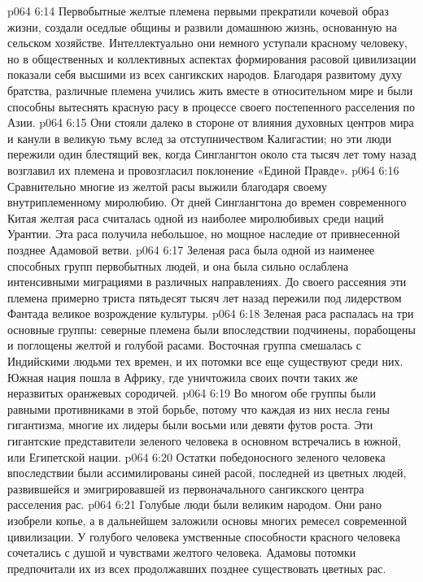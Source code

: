 \vs p064 6:14 \bibnobreakspace {} Первобытные желтые племена первыми прекратили кочевой образ жизни, создали оседлые общины и развили домашнюю жизнь, основанную на сельском хозяйстве. Интеллектуально они немного уступали красному человеку, но в общественных и коллективных аспектах формирования расовой цивилизации показали себя высшими из всех сангикских народов. Благодаря развитому духу братства, различные племена учились жить вместе в относительном мире и были способны вытеснять красную расу в процессе своего постепенного расселения по Азии.
\vs p064 6:15 Они стояли далеко в стороне от влияния духовных центров мира и канули в великую тьму вслед за отступничеством Калигастии; но эти люди пережили один блестящий век, когда Синглангтон около ста тысяч лет тому назад возглавил их племена и провозгласил поклонение «Единой Правде».
\vs p064 6:16 Сравнительно многие из желтой расы выжили благодаря своему внутриплеменному миролюбию. От дней Синглангтона до времен современного Китая желтая раса считалась одной из наиболее миролюбивых среди наций Урантии. Эта раса получила небольшое, но мощное наследие от привнесенной позднее Адамовой ветви.
\vs p064 6:17 \bibnobreakspace {} Зеленая раса была одной из наименее способных групп первобытных людей, и она была сильно ослаблена интенсивными миграциями в различных направлениях. До своего рассеяния эти племена примерно триста пятьдесят тысяч лет назад пережили под лидерством Фантада великое возрождение культуры.
\vs p064 6:18 Зеленая раса распалась на три основные группы: северные племена были впоследствии подчинены, порабощены и поглощены желтой и голубой расами. Восточная группа смешалась с Индийскими людьми тех времен, и их потомки все еще существуют среди них. Южная нация пошла в Африку, где уничтожила своих почти таких же неразвитых оранжевых сородичей.
\vs p064 6:19 Во многом обе группы были равными противниками в этой борьбе, потому что каждая из них несла гены гигантизма, многие их лидеры были восьми или девяти футов роста. Эти гигантские представители зеленого человека в основном встречались в южной, или Египетской нации.
\vs p064 6:20 Остатки победоносного зеленого человека впоследствии были ассимилированы синей расой, последней из цветных людей, развившейся и эмигрировавшей из первоначального сангикского центра расселения рас.
\vs p064 6:21 \bibnobreakspace {} Голубые люди были великим народом. Они рано изобрели копье, а в дальнейшем заложили основы многих ремесел современной цивилизации. У голубого человека умственные способности красного человека сочетались с душой и чувствами желтого человека. Адамовы потомки предпочитали их из всех продолжавших позднее существовать цветных рас.
